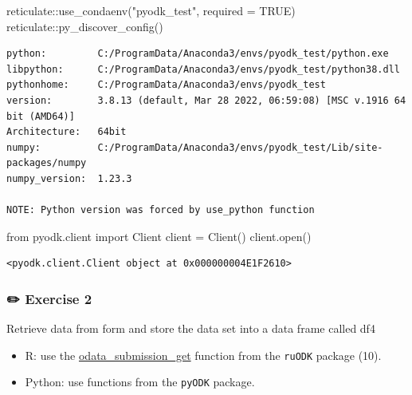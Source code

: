 \documentclass[
  letterpaper,
  DIV=11,
  numbers=noendperiod,
  oneside]{scrreprt}
\newenvironment{Shaded}{\begin{snugshade}}{\end{snugshade}}
\newcommand{\AttributeTok}[1]{\textcolor[rgb]{0.40,0.45,0.13}{#1}}
\newcommand{\BuiltInTok}[1]{\textcolor[rgb]{0.00,0.23,0.31}{#1}}
\newcommand{\ConstantTok}[1]{\textcolor[rgb]{0.56,0.35,0.01}{#1}}
\newcommand{\FunctionTok}[1]{\textcolor[rgb]{0.28,0.35,0.67}{#1}}
\newcommand{\ImportTok}[1]{\textcolor[rgb]{0.00,0.46,0.62}{#1}}
\newcommand{\NormalTok}[1]{\textcolor[rgb]{0.00,0.23,0.31}{#1}}
\newcommand{\OperatorTok}[1]{\textcolor[rgb]{0.37,0.37,0.37}{#1}}
\newcommand{\SpecialCharTok}[1]{\textcolor[rgb]{0.37,0.37,0.37}{#1}}
\newcommand{\StringTok}[1]{\textcolor[rgb]{0.13,0.47,0.30}{#1}}
\providecommand{\tightlist}{%
  \setlength{\itemsep}{0pt}\setlength{\parskip}{0pt}}\usepackage{longtable,booktabs,array}
\begin{document}
\begin{Shaded}
\begin{Highlighting}[]
\NormalTok{reticulate}\SpecialCharTok{::}\FunctionTok{use\_condaenv}\NormalTok{(}\StringTok{"pyodk\_test"}\NormalTok{, }\AttributeTok{required =} \ConstantTok{TRUE}\NormalTok{)}
\NormalTok{reticulate}\SpecialCharTok{::}\FunctionTok{py\_discover\_config}\NormalTok{()}
\end{Highlighting}
\end{Shaded}

\begin{verbatim}
python:         C:/ProgramData/Anaconda3/envs/pyodk_test/python.exe
libpython:      C:/ProgramData/Anaconda3/envs/pyodk_test/python38.dll
pythonhome:     C:/ProgramData/Anaconda3/envs/pyodk_test
version:        3.8.13 (default, Mar 28 2022, 06:59:08) [MSC v.1916 64 bit (AMD64)]
Architecture:   64bit
numpy:          C:/ProgramData/Anaconda3/envs/pyodk_test/Lib/site-packages/numpy
numpy_version:  1.23.3

NOTE: Python version was forced by use_python function
\end{verbatim}

\begin{Shaded}
\begin{Highlighting}[]
\ImportTok{from}\NormalTok{ pyodk.client }\ImportTok{import}\NormalTok{ Client}
\NormalTok{client }\OperatorTok{=}\NormalTok{ Client()}
\NormalTok{client.}\BuiltInTok{open}\NormalTok{()}
\end{Highlighting}
\end{Shaded}

\begin{verbatim}
<pyodk.client.Client object at 0x000000004E1F2610>
\end{verbatim}

\hypertarget{exercise-2-3}{%
\subsubsection{\texorpdfstring{{✏️} Exercise
2}{✏️ Exercise 2}}\label{exercise-2-3}}

Retrieve data from form and store the data set into a data frame called
df4

\begin{tcolorbox}[enhanced jigsaw, colbacktitle=quarto-callout-tip-color!10!white, titlerule=0mm, breakable, opacityback=0, opacitybacktitle=0.6, left=2mm, coltitle=black, colback=white, title=\textcolor{quarto-callout-tip-color}{\faLightbulb}\hspace{0.5em}{Tip}, rightrule=.15mm, colframe=quarto-callout-tip-color-frame, toprule=.15mm, bottomtitle=1mm, toptitle=1mm, arc=.35mm, bottomrule=.15mm, leftrule=.75mm]

\begin{itemize}
\tightlist
\item
  R: use the
  \href{https://docs.ropensci.org/ruODK/reference/odata_submission_get.html}{odata\_submission\_get}
  function from the \texttt{ruODK} package (10).
\item
  Python: use functions from the \texttt{pyODK} package.
\end{itemize}

\end{tcolorbox}
\end{document}
